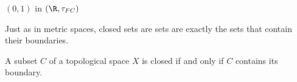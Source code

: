 \begin{activity}
\begin{comment}
\end{comment}
 

\item $(0,1)$ in $(\R, \tau_{FC})$ 



\begin{comment}

\solution Let $x \in \R$. If $N$ is a neighborhood of $x$, then $N$ must contain some open set $O$ that contains $x$. Since $O$ is an open set, it follows that $O \setminus (0,1)$ is a finite set. Also, $O \setminus (\R \setminus (0,1))$ must be finite. So $O$ contains infinitely many points in $(0,1)$ and infinitely many points in $\R \setminus (0,1)$. Therefore, every point in $\R$ is both a limit point and a boundary point of $(0,1)$. 


\end{comment}

\ea

\end{activity}



Just as in metric spaces, closed sets are sets are exactly the sets that contain their boundaries. 



\begin{theorem} \label{thm:TS_Closed_boundary} A subset $C$ of a topological space $X$ is closed if and only if $C$ contains its boundary. 
\end{theorem}

\begin{comment}

\begin{proof} Let $X$ be a topological space, and let $C$ be a subset of $X$. First we assume that $C$ is closed and show that $C$ contains its boundary. Let $x \in X$ be a boundary point of $C$. We proceed by contradiction and assume that $x \notin C$. Then $x \in X \setminus C$, which is an open set. But then this neighborhood $X \setminus C$ contains no points in $C$, which contradicts the fact that $x$ is a boundary point of $C$. We conclude that $x \in C$ and $C$ contains its boundary.

For the converse, assume that $C$ contains its boundary. To show that $C$ is closed, we prove that $C$ contains its limit points. Let $x$ be a limits point of $C$. To show that $x \in C$, assume to the contrary that $x \notin C$. Then $x \in X \setminus C$, an open set. Since $X \setminus C$ is a neighborhood of each of its points, the fact that $x$ is a limit point of $C$ implies that $X \setminus C$ must contain a point of $C$, a contradiction. We conclude that $x \in C$ and $C$ contains its limit points. Therefore, $C$ is closed. 
\end{proof}
\end{comment}




